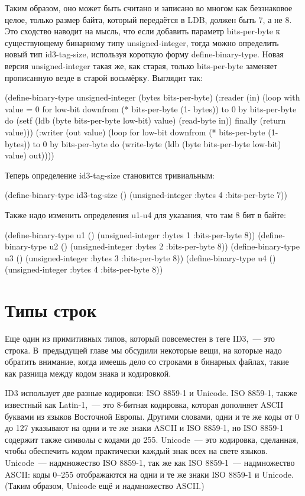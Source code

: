 Таким образом, оно может быть считано и записано во многом как беззнаковое целое, только
размер байта, который передаётся в LDB, должен быть 7, а не 8.  Это сходство наводит на
мысль, что если добавить параметр bits-per-byte к существующему бинарному типу
unsigned-integer, тогда можно определить новый тип id3-tag-size, используя короткую форму
define-binary-type.  Новая версия unsigned-integer такая же, как старая, только
bits-per-byte заменяет прописанную везде в старой восьмёрку.  Выглядит так:

\begin{myverb}
(define-binary-type unsigned-integer (bytes bits-per-byte)
  (:reader (in)
    (loop with value = 0
       for low-bit downfrom (* bits-per-byte (1- bytes)) to 0 by bits-per-byte do
         (setf (ldb (byte bits-per-byte low-bit) value) (read-byte in))
       finally (return value)))
  (:writer (out value)
    (loop for low-bit downfrom (* bits-per-byte (1- bytes)) to 0 by bits-per-byte
       do (write-byte (ldb (byte bits-per-byte low-bit) value) out))))
\end{myverb}

Теперь определение id3-tag-size становится тривиальным:

\begin{myverb}
(define-binary-type id3-tag-size () (unsigned-integer :bytes 4 :bits-per-byte 7))
\end{myverb}

Также надо изменить определения u1-u4 для указания, что там 8 бит в байте:

\begin{myverb}
(define-binary-type u1 () (unsigned-integer :bytes 1 :bits-per-byte 8))
(define-binary-type u2 () (unsigned-integer :bytes 2 :bits-per-byte 8))
(define-binary-type u3 () (unsigned-integer :bytes 3 :bits-per-byte 8))
(define-binary-type u4 () (unsigned-integer :bytes 4 :bits-per-byte 8))
\end{myverb}

\section{Типы строк}

Еще один из примитивных типов, который повсеместен в теге ID3,~--- это строка.  
В~предыдущей главе мы обсудили некоторые вещи, на которые надо обратить
внимание, когда имеешь дело со строками в бинарных файлах, такие как разница между кодом
знака и кодировкой.

ID3 использует две разные кодировки: ISO 8859-1 и Unicode. ISO 8859-1, также известный как
Latin-1,~--- это 8-битная кодировка, которая дополняет ASCII буквами
из языков Восточной Европы.  Другими словами, одни и те же коды от 0 до 127 указывают на
одни и те же знаки ASCII и ISO 8859-1, но ISO 8859-1 содержит также символы с кодами до 255. 
Unicode~--- это кодировка, сделанная, чтобы обеспечить кодом практически каждый 
знак всех на свете языков.  Unicode~--- надмножество ISO 8859-1, так же
как ISO 8859-1~--- надмножество ASCII: коды 0--255 отображаются на одни и те же знаки ISO
8859-1 и Unicode. (Таким образом, Unicode ещё и надмножество ASCII.)


